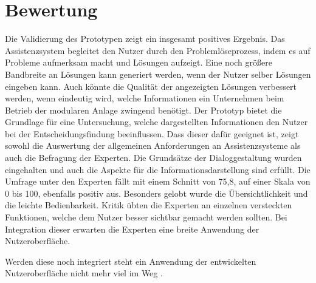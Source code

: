 \section{Bewertung}
Die Validierung des Prototypen zeigt ein insgesamt positives Ergebnis. Das Assistenzsystem begleitet den Nutzer durch den Problemlöseprozess, indem es auf Probleme aufmerksam macht und Lösungen aufzeigt. Eine noch größere Bandbreite an Lösungen kann generiert werden, wenn der Nutzer selber Lösungen eingeben kann. Auch könnte die Qualität der angezeigten Lösungen verbessert werden, wenn eindeutig wird, welche Informationen ein Unternehmen beim Betrieb der modularen Anlage zwingend benötigt. Der Prototyp bietet die Grundlage für eine Untersuchung, welche dargestellten Informationen den Nutzer bei der Entscheidungsfindung beeinflussen. Dass dieser dafür geeignet ist, zeigt sowohl die Auswertung der allgemeinen Anforderungen an Assistenzsysteme als auch die Befragung der Experten. Die Grundsätze der Dialoggestaltung wurden eingehalten und auch die Aspekte für die Informationsdarstellung sind erfüllt. Die Umfrage unter den Experten fällt mit einem Schnitt von 75,8, auf einer Skala von 0 bis 100, ebenfalls positiv aus. Besonders gelobt wurde die Übersichtlichkeit und die leichte Bedienbarkeit. Kritik übten die Experten an einzelnen versteckten Funktionen, welche dem Nutzer besser sichtbar gemacht werden sollten. Bei Integration dieser erwarten die Experten eine breite Anwendung der Nutzeroberfläche.

Werden diese noch integriert steht ein Anwendung der entwickelten Nutzeroberfläche nicht mehr viel im Weg .
